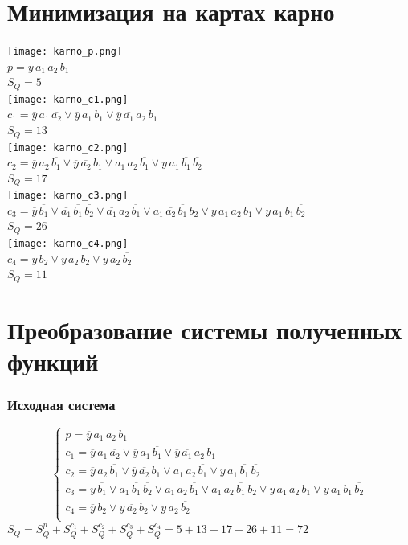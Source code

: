\documentclass[12pt,a4paper]{report}
\makeatletter
\newcommand{\mathleft}{\@fleqntrue\@mathmargin0pt}
\makeatother
\begin{document}
\section*{Минимизация на картах карно}
\texttt{[image: karno\_p.png]}\\
$p=\overline{y}\,a_1\,a_2\,b_1$\\
$S_Q=5$\\
\hfill\break
\texttt{[image: karno\_c1.png]}\\
$c_1=\overline{y}\,a_1\,\overline{a_2} \lor \overline{y}\,a_1\,\overline{b_1} \lor \overline{y}\,\overline{a_1}\,a_2\,b_1$\\
$S_Q=13$\\
\hfill\break
\texttt{[image: karno\_c2.png]}\\
$c_2=\overline{y}\,a_2\,\overline{b_1}\lor \overline{y}\,\overline{a_2}\,b_1 \lor a_1\,a_2\,\overline{b_1} \lor y\,a_1\,\overline{b_1}\,\overline{b_2}$\\
$S_Q=17$\\
\hfill\break
\texttt{[image: karno\_c3.png]}\\
$c_3=\overline{y}\,\overline{b_1} \lor \overline{a_1}\,\overline{b_1}\,\overline{b_2}\lor \overline{a_1}\,a_2\,\overline{b_1}\lor a_1\,\overline{a_2}\,\overline{b_1}\,b_2\lor y\,a_1\,a_2\,b_1\lor y\,a_1\,b_1\,\overline{b_2}$\\
$S_Q=26$\\
\hfill\break
\texttt{[image: karno\_c4.png]}\\
$c_4=\overline{y}\,b_2\lor y\,\overline{a_2}\,b_2 \lor y\,a_2\,\overline{b_2}$\\
$S_Q=11$\\
\section*{Преобразование системы полученных функций}
\mathleft
\subsubsection*{Исходная система}
\begin{equation*}
    \begin{cases}
        p=\overline{y}\,a_1\,a_2\,b_1\\
        c_1=\overline{y}\,a_1\,\overline{a_2} \lor \overline{y}\,a_1\,\overline{b_1} \lor \overline{y}\,\overline{a_1}\,a_2\,b_1\\
        c_2=\overline{y}\,a_2\,\overline{b_1}\lor \overline{y}\,\overline{a_2}\,b_1 \lor a_1\,a_2\,\overline{b_1} \lor y\,a_1\,\overline{b_1}\,\overline{b_2}\\
        c_3=\overline{y}\,\overline{b_1} \lor \overline{a_1}\,\overline{b_1}\,\overline{b_2}\lor \overline{a_1}\,a_2\,\overline{b_1}\lor a_1\,\overline{a_2}\,\overline{b_1}\,b_2\lor y\,a_1\,a_2\,b_1\lor y\,a_1\,b_1\,\overline{b_2}\\
        c_4=\overline{y}\,b_2\lor y\,\overline{a_2}\,b_2 \lor y\,a_2\,\overline{b_2}\\
    \end{cases}
\end{equation*}
$S_Q=S_Q^p+S_Q^{c_1}+S_Q^{c_2}+S_Q^{c_3}+S_Q^{c_4}=5+13+17+26+11=72$
\end{document}
